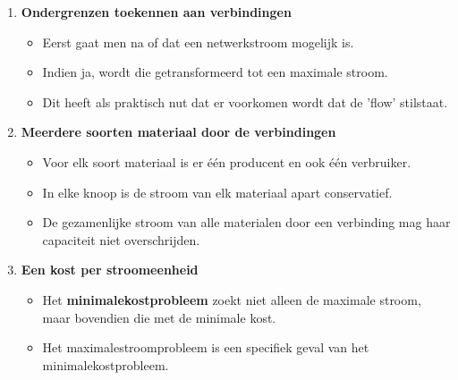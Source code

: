 \begin{enumerate}
\begin{itemize}
    \end{itemize}
    \item \textbf{Ondergrenzen toekennen aan verbindingen}
    \begin{itemize}
        \item Eerst gaat men na of dat een netwerkstroom mogelijk is.
        \item Indien ja, wordt die getransformeerd tot een maximale stroom.
        \item Dit heeft als praktisch nut dat er voorkomen wordt dat de 'flow' stilstaat.
    \end{itemize}
    \item \textbf{Meerdere soorten materiaal door de verbindingen}
    \begin{itemize}
        \item Voor elk soort materiaal is er één producent en ook één verbruiker.
        \item In elke knoop is de stroom van elk materiaal apart conservatief.
        \item De gezamenlijke stroom van alle materialen door een verbinding mag haar capaciteit niet overschrijden.
    \end{itemize}
    \item \textbf{Een kost per stroomeenheid}
    \begin{itemize}
        \item Het \textbf{minimalekostprobleem} zoekt niet alleen de maximale stroom, maar bovendien die met de minimale kost.
        \item Het maximalestroomprobleem is een specifiek geval van het minimalekostprobleem.
    \end{itemize}
\end{enumerate}

